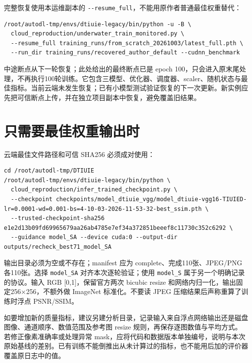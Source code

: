 \documentclass[UTF8,11pt,a4paper,fontset=windows]{ctexart}
\begin{document}
完整恢复使用本运维副本的 \texttt{-\allowbreak{}-\allowbreak{}resume\_\allowbreak{}ful\allowbreak{}l}，不能用原作者普通最佳权重替代：

\begin{Verbatim}[breaklines=true,breakanywhere=true,fontsize=\scriptsize,frame=single]
/root/autodl-tmp/envs/dtiuie-legacy/bin/python -u -B \
  cloud_reproduction/underwater_train_monitored.py \
  --resume_full training_runs/from_scratch_20261003/latest_full.pth \
  --run_dir training_runs/recovered_author_default --cudnn_benchmark
\end{Verbatim}

中途断点从下一轮恢复；此处给出的最终断点已是 epoch 100，只会进入原末尾处理，不再执行100轮训练。它包含三模型、优化器、调度器、scaler、随机状态与最佳指标。当前云端未发生恢复；已有小模型测试验证恢复的下一次更新。新实例应先把可信断点上传，并在独立项目副本中恢复，避免覆盖旧结果。

\section{只需要最佳权重输出时}

云端最佳文件路径和可信 SHA256 必须成对使用：

\begin{Verbatim}[breaklines=true,breakanywhere=true,fontsize=\scriptsize,frame=single]
cd /root/autodl-tmp/DTIUIE
/root/autodl-tmp/envs/dtiuie-legacy/bin/python \
  cloud_reproduction/infer_trained_checkpoint.py \
  --checkpoint checkpoints/model_dtiuie_vgg/model_dtiuie-vgg16-TIUIED-lr=0.0001-wd=0.001-bs=4-10-03-2026-11-53-32-best_ssim.pth \
  --trusted-checkpoint-sha256 e1e2d13b09fd69965679aa26ab4785e7ef34a372851beeef8c11730c352c6292 \
  --guidance model_SA --device cuda:0 --output-dir outputs/recheck_best71_model_SA
\end{Verbatim}

输出目录必须为空或不存在；manifest 应为 complete、完成110张、JPEG/PNG各110张。选择 \texttt{model\_\allowbreak{}SA} 对齐本次逐轮验证；使用 \texttt{model\_\allowbreak{}S} 属于另一个明确记录的协议。输入 RGB [0,1]，保留官方两次 bicubic resize 和网络内归一化，输出固定256×256，不额外做 ImageNet 标准化。不要读 JPEG 压缩结果后声称重算了训练时浮点 PSNR/SSIM。

如要增加新的质量指标，建议另建分析目录，记录输入来自浮点网络输出还是磁盘图像、通道顺序、数值范围及参考图 resize 规则，再保存逐图数值与平均方式。若修正像素准确率或处理异常 mask，应将代码和数据版本单独编号，说明与本次原始基线的差别。已有训练不能倒推出从未计算过的指标，也不能用后加的评价器覆盖原日志中的值。
\end{document}

